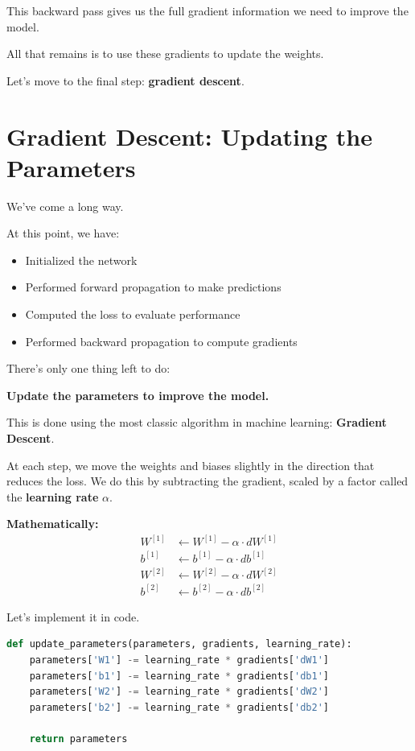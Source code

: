 \documentclass[11pt]{article}
\begin{document}
\bigskip

This backward pass gives us the full gradient information we need to improve the model.

All that remains is to use these gradients to update the weights.

Let’s move to the final step: \textbf{gradient descent}.

\section*{Gradient Descent: Updating the Parameters}

We’ve come a long way.

At this point, we have:
\begin{itemize}
    \item Initialized the network
    \item Performed forward propagation to make predictions
    \item Computed the loss to evaluate performance
    \item Performed backward propagation to compute gradients
\end{itemize}

There’s only one thing left to do:

\begin{center}
\Large \textbf{Update the parameters to improve the model.}
\end{center}

This is done using the most classic algorithm in machine learning:  
\textbf{Gradient Descent}.

At each step, we move the weights and biases slightly in the direction that reduces the loss.  
We do this by subtracting the gradient, scaled by a factor called the \textbf{learning rate} $\alpha$.

\bigskip

\textbf{Mathematically:}
\[
\begin{aligned}
W^{[1]} &\leftarrow W^{[1]} - \alpha \cdot dW^{[1]} \\
b^{[1]} &\leftarrow b^{[1]} - \alpha \cdot db^{[1]} \\
W^{[2]} &\leftarrow W^{[2]} - \alpha \cdot dW^{[2]} \\
b^{[2]} &\leftarrow b^{[2]} - \alpha \cdot db^{[2]}
\end{aligned}
\]

Let’s implement it in code.

\begin{lstlisting}[language=Python]
def update_parameters(parameters, gradients, learning_rate):
    parameters['W1'] -= learning_rate * gradients['dW1']
    parameters['b1'] -= learning_rate * gradients['db1']
    parameters['W2'] -= learning_rate * gradients['dW2']
    parameters['b2'] -= learning_rate * gradients['db2']

    return parameters
\end{lstlisting}
\end{document}
